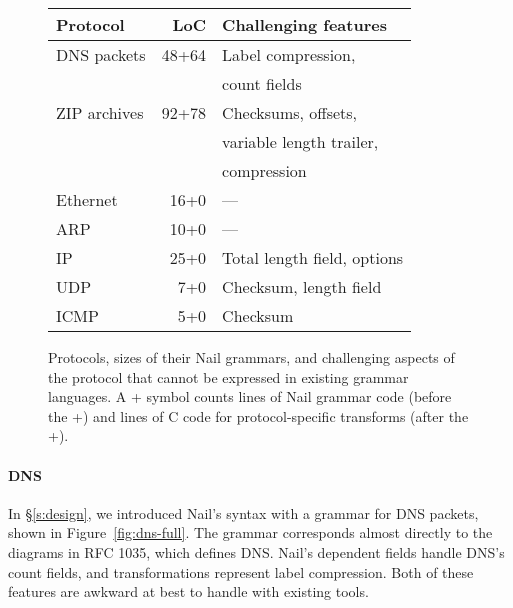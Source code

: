 \begin{figure}[tb]
\smaller[0.5]
\centering
\begin{tabular}{lrl}
\toprule
\textbf{Protocol} & \textbf{LoC} & \textbf{Challenging features} \\ 
\midrule
DNS packets & 48+64 & Label compression,\\
  & & count fields \\
ZIP archives & 92+78 & Checksums, offsets, \\ 
  & & variable length trailer, \\
  & & compression \\
Ethernet  & 16+0\phantom{0} & --- \\
ARP       & 10+0\phantom{0} & --- \\
IP        & 25+0\phantom{0} & Total length field, options \\
UDP       &  7+0\phantom{0} & Checksum, length field \\
ICMP      &  5+0\phantom{0} & Checksum \\
\bottomrule
\end{tabular}

\caption{Protocols, sizes of their Nail grammars, and challenging aspects
of the protocol that cannot be expressed in existing grammar languages.
A + symbol counts lines of Nail grammar code (before the +) and lines of
C code for protocol-specific transforms (after the +).}
\label{fig:eval-protocols}
\end{figure}

\paragraph{DNS} In \S\ref{s:design}, we introduced Nail's syntax with a grammar
for DNS packets, shown in Figure~\ref{fig:dns-full}.
The grammar corresponds almost directly to the diagrams in RFC 1035,
which defines DNS\@. Nail's dependent fields handle DNS's count fields, and
transformations represent label compression. Both of these features are awkward at best to handle
with existing tools.


